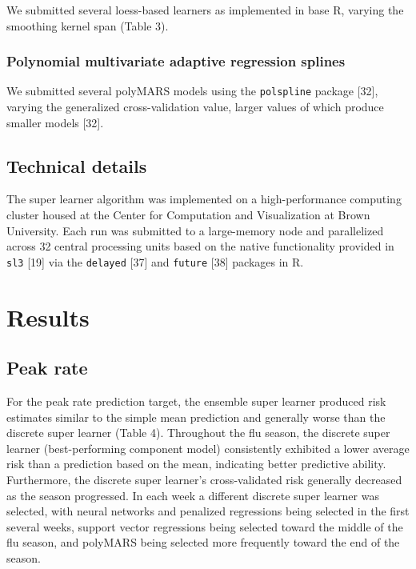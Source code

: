 \documentclass[10pt,letterpaper]{article}
\begin{document}
We submitted several loess-based learners as implemented in base R,
varying the smoothing kernel span (Table 3).

\hypertarget{polynomial-multivariate-adaptive-regression-splines}{%
\subsubsection{Polynomial multivariate adaptive regression
splines}\label{polynomial-multivariate-adaptive-regression-splines}}

We submitted several polyMARS models using the \texttt{polspline}
package {[}32{]}, varying the generalized cross-validation value, larger
values of which produce smaller models {[}32{]}.

\hypertarget{technical-details}{%
\subsection{Technical details}\label{technical-details}}

The super learner algorithm was implemented on a high-performance
computing cluster housed at the Center for Computation and Visualization
at Brown University. Each run was submitted to a large-memory node and
parallelized across 32 central processing units based on the native
functionality provided in \texttt{sl3} {[}19{]} via the \texttt{delayed}
{[}37{]} and \texttt{future} {[}38{]} packages in R.

\hypertarget{results}{%
\section{Results}\label{results}}

\hypertarget{peak-rate}{%
\subsection{Peak rate}\label{peak-rate}}

For the peak rate prediction target, the ensemble super learner produced
risk estimates similar to the simple mean prediction and generally worse
than the discrete super learner (Table 4). Throughout the flu season,
the discrete super learner (best-performing component model)
consistently exhibited a lower average risk than a prediction based on
the mean, indicating better predictive ability. Furthermore, the
discrete super learner's cross-validated risk generally decreased as the
season progressed. In each week a different discrete super learner was
selected, with neural networks and penalized regressions being selected
in the first several weeks, support vector regressions being selected
toward the middle of the flu season, and polyMARS being selected more
frequently toward the end of the season.
\end{document}
